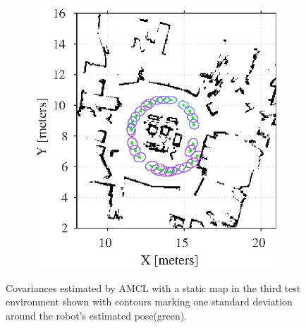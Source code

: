 \begin{figure}[htbp]
	\centering
	\begin{subfigure}[t]{0.55\textwidth}
		\includegraphics[scale=1.0]{chapters/evaluation/figures/localization_static_map3}		
	\end{subfigure}
	\begin{subfigure}[t]{0.2\textwidth}
	\end{subfigure}
	\caption{Covariances estimated by AMCL with a static map in the third test environment shown with contours marking one standard deviation around the robot's estimated pose(green).}
    \label{fig:amcl_covariance_static3}
\end{figure}

